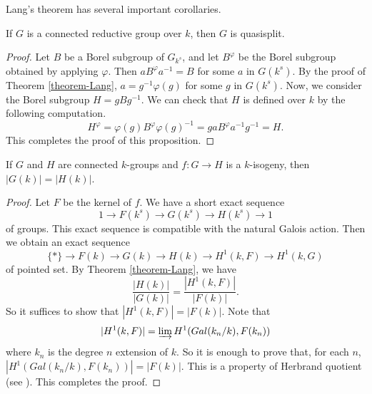 Lang's theorem has several important corollaries.
\begin{proposition}
 \label{proposition-quasisplit}
If $G$ is a connected reductive group over $k$, then $G$ is quasisplit.
\end{proposition}
\begin{proof}
 Let $B$ be a Borel subgroup of $G_{k^{s}}$, and let $B^{\varphi}$ be the Borel subgroup obtained by applying $\varphi$. Then $aB^{\varphi}a^{-1}=B$ for some $a$ in $G(k^{s})$. By the proof of Theorem \ref{theorem-Lang}, $a=g^{-1}\varphi (g)$ for some $g$ in $G(k^{s})$. Now, we consider the Borel subgroup $H=gBg^{-1}$. We can check that $H$ is defined over $k$ by the following computation.
\[
H^{\varphi}=\varphi(g)B^{\varphi} \varphi(g)^{-1}=gaB^{\varphi}a^{-1}g^{-1}=H.
\]
This completes the proof of this proposition.

\end{proof}

\begin{proposition}
 \label{proposition-Lang-isogeny}
If $G$ and $H$ are connected $k$-groups and $f: G\rightarrow H$ is a $k$-isogeny, then $|G(k)|=|H(k)|$.
\end{proposition}

\begin{proof}
Let $F$ be the kernel of $f $. We have a short exact sequence
\[
1\rightarrow F(k^{s})\rightarrow G(k^{s})\rightarrow H(k^{s})\rightarrow 1
\]
of groups. This exact sequence is compatible with the natural Galois action. Then we obtain an exact sequence 
\[
\{\ast\}\rightarrow F(k)\rightarrow G(k)\rightarrow H(k)\rightarrow H^{1}(k, F)\rightarrow H^{1}(k, G)
\]
of pointed set. By Theorem \ref{theorem-Lang}, we have 
\[
\frac{|H(k)|}{|G(k)|}=\frac{|H^{1}(k, F)|}{|F(k)|}.  
\]
So it suffices to show that $|H^{1}(k, F)|=|F(k)|$. Note that 
\[
|H^{1}(k, F)|=\varinjlim H^1(Gal (k_{n}/k), F(k_{n}))
\]
where $k_n$ is the degree $n$ extension of $k$. So it is enough to prove that, for each $n$, $|H^1(Gal (k_{n}/k), F(k_{n}))|=|F(k)|$. This is a property of Herbrand quotient (see \cite[Proposition 11]{Atiyah-Wall}). This completes the proof.
\end{proof}

